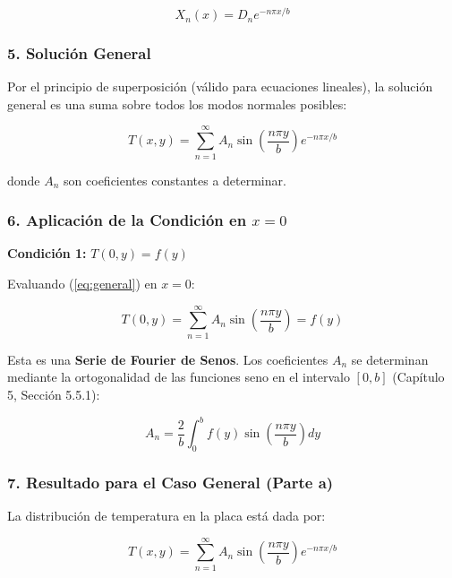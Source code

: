 \documentclass[a4paper]{article}
\begin{document}
\begin{equation}
X_n(x) = D_n e^{-n\pi x/b}
\end{equation}

\subsubsection{5. Solución General}

Por el principio de superposición (válido para ecuaciones lineales), la solución general es una suma sobre todos los modos normales posibles:

\begin{equation}
T(x, y) = \sum_{n=1}^{\infty} A_n \sin\left(\frac{n\pi y}{b}\right) e^{-n\pi x/b}
\label{eq:general}
\end{equation}

donde $A_n$ son coeficientes constantes a determinar.

\subsubsection{6. Aplicación de la Condición en $x = 0$}

\textbf{Condición 1:} $T(0, y) = f(y)$

Evaluando (\ref{eq:general}) en $x = 0$:

\begin{equation}
T(0, y) = \sum_{n=1}^{\infty} A_n \sin\left(\frac{n\pi y}{b}\right) = f(y)
\end{equation}

Esta es una \textbf{Serie de Fourier de Senos}. Los coeficientes $A_n$ se determinan mediante la ortogonalidad de las funciones seno en el intervalo $[0, b]$ (Capítulo 5, Sección 5.5.1):

\begin{equation}
A_n = \frac{2}{b} \int_0^b f(y) \sin\left(\frac{n\pi y}{b}\right) dy
\label{eq:An}
\end{equation}

\subsubsection{7. Resultado para el Caso General (Parte a)}

La distribución de temperatura en la placa está dada por:

\begin{equation}
\boxed{T(x, y) = \sum_{n=1}^{\infty} A_n \sin\left(\frac{n\pi y}{b}\right) e^{-n\pi x/b}}
\end{equation}
\end{document}

